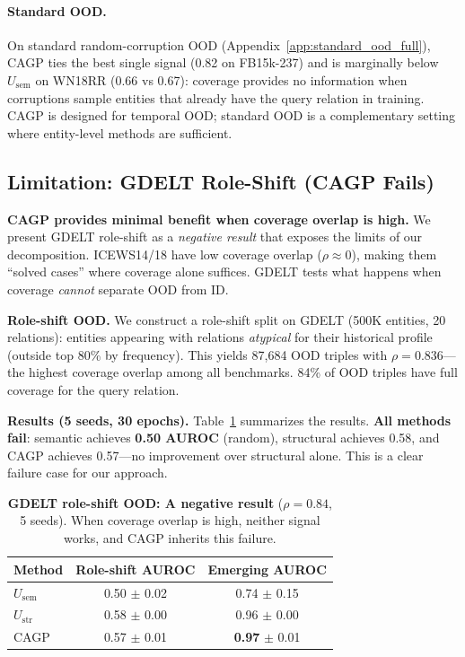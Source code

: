 \paragraph{Standard OOD.}
On standard random-corruption OOD (Appendix~\ref{app:standard_ood_full}), CAGP ties the best single signal (0.82 on FB15k-237) and is marginally below $U_{\text{sem}}$ on WN18RR (0.66 vs 0.67): coverage provides no information when corruptions sample entities that already have the query relation in training. CAGP is designed for temporal OOD; standard OOD is a complementary setting where entity-level methods are sufficient.

\subsection{Limitation: GDELT Role-Shift (CAGP Fails)}
\label{sec:gdelt}

\textbf{CAGP provides minimal benefit when coverage overlap is high.} We present GDELT role-shift as a \emph{negative result} that exposes the limits of our decomposition. ICEWS14/18 have low coverage overlap ($\rho \approx 0$), making them ``solved cases'' where coverage alone suffices. GDELT tests what happens when coverage \emph{cannot} separate OOD from ID.

\textbf{Role-shift OOD.} We construct a role-shift split on GDELT (500K entities, 20 relations): entities appearing with relations \emph{atypical} for their historical profile (outside top 80\% by frequency). This yields 87,684 OOD triples with $\rho = 0.836$---the highest coverage overlap among all benchmarks. 84\% of OOD triples have full coverage for the query relation.

\textbf{Results (5 seeds, 30 epochs).} Table~\ref{tab:gdelt} summarizes the results. \textbf{All methods fail}: semantic achieves \textbf{0.50 AUROC} (random), structural achieves 0.58, and CAGP achieves 0.57---no improvement over structural alone. This is a clear failure case for our approach.

\begin{table}[ht]
\centering
\caption{\textbf{GDELT role-shift OOD: A negative result} ($\rho = 0.84$, 5 seeds). When coverage overlap is high, neither signal works, and CAGP inherits this failure.\label{tab:gdelt}}
\begin{tabular}{lcc}
\toprule
Method & Role-shift AUROC & Emerging AUROC \\
\midrule
$U_{\text{sem}}$ & 0.50 $\pm$ 0.02 & 0.74 $\pm$ 0.15 \\
$U_{\text{str}}$ & 0.58 $\pm$ 0.00 & 0.96 $\pm$ 0.00 \\
CAGP & 0.57 $\pm$ 0.01 & \textbf{0.97} $\pm$ 0.01 \\
\bottomrule
\end{tabular}
\end{table}

